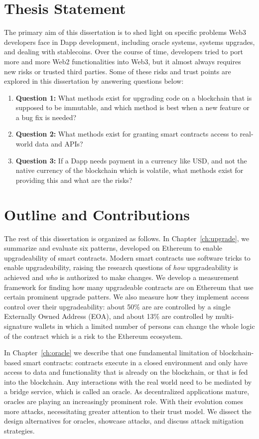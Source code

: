 \section{Thesis Statement}
The primary aim of this dissertation is to shed light on specific problems Web3 developers face in Dapp development, including oracle systems, systems upgrades, and dealing with stablecoins. Over the course of time, developers tried to port more and more Web2 functionalities into Web3, but it almost always requires new risks or trusted third parties. Some of these risks and trust points are explored in this dissertation by answering questions below:

\begin{enumerate}
    \item \textbf{Question 1:} What methods exist for upgrading code on a blockchain that is supposed to be immutable, and which method is best when a new feature or a bug fix is needed?
    \item \textbf{Question 2:} What methods exist for granting smart contracts access to real-world data and APIs?
    \item \textbf{Question 3:} If a Dapp needs payment in a currency like USD, and not the native currency of the blockchain which is volatile, what methods exist for providing this and what are the risks?
\end{enumerate}


\section{Outline and Contributions}

The rest of this dissertation is organized as follows. In Chapter~\ref{ch:upgrade}, we summarize and evaluate six patterns, developed on Ethereum to enable upgradeability of smart contracts. Modern smart contracts use software tricks to enable upgradeability, raising the research questions of \textit{how} upgradeability is achieved and \textit{who} is authorized to make changes. We develop a measurement framework for finding how many upgradeable contracts are on Ethereum that use certain prominent upgrade patters. We also measure how they implement access control over their upgradeability: about 50\% are are controlled by a single Externally Owned Address (EOA), and about 13\% are controlled by multi-signature wallets in which a limited number of persons can change the whole logic of the contract which is a risk to the Ethereum ecosystem.

In Chapter~\ref{ch:oracle} we describe that one fundamental limitation of blockchain-based smart contracts: contracts execute in a closed environment and only have access to data and functionality that is already on the blockchain, or that is fed into the blockchain. Any interactions with the real world need to be mediated by a bridge service, which is called an oracle. As decentralized applications mature, oracles are playing an increasingly prominent role. With their evolution comes more attacks, necessitating greater attention to their trust model. We dissect the design alternatives for oracles, showcase attacks, and discuss attack mitigation strategies.

